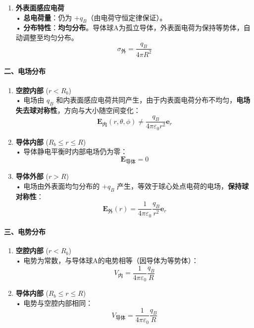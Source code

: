 \documentclass{article}
\begin{document}
{\begin{enumerate}
    \item \textbf{外表面感应电荷}  \\
    • \textbf{总电荷量}：仍为 \(+q_B\)（由电荷守恒定律保证）。  \\
    • \textbf{分布特性}：\textbf{均匀分布}。导体球A为孤立导体，外表面电荷为保持等势体，自动调整至均匀分布。  \\
    \[
    \sigma_{\text{外}} = \frac{q_B}{4\pi R^2}
    \]
\end{enumerate}


\paragraph*{二、电场分布}


\begin{enumerate}
    \item \textbf{空腔内部} (\(r < R_b\))  \\
    • 电场由 \(q_B\) 和内表面感应电荷共同产生，由于内表面电荷分布不均匀，\textbf{电场失去球对称性}，方向与大小随空间变化：  
    \[
    \mathbf{E}_\text{内}(r, \theta, \phi) \neq \frac{q_B}{4\pi\varepsilon_0 r^2} \mathbf{e}_r
    \]

    \item \textbf{导体内部} (\(R_b \leq r \leq R\))  \\
    • 导体静电平衡时内部电场仍为零：  
    \[
    \mathbf{E}_\text{导体} = 0
    \]

    \item \textbf{导体外部} (\(r > R\))  \\
    • 电场由外表面均匀分布的 \(+q_B\) 产生，等效于球心处点电荷的电场，\textbf{保持球对称性}：  
    \[
    \mathbf{E}_\text{外}(r) = \frac{1}{4\pi\varepsilon_0} \frac{q_B}{r^2} \mathbf{e}_r
    \]
\end{enumerate}



\paragraph*{三、电势分布}

\begin{enumerate}
    \item \textbf{空腔内部} (\(r < R_b\))  \\
    • 电势为常数，与导体球A的电势相等（因导体为等势体）：  
    \[
    V_\text{内} = \frac{1}{4\pi\varepsilon_0} \frac{q_B}{R}
    \]

    \item \textbf{导体内部} (\(R_b \leq r \leq R\))  \\
    • 电势与空腔内部相同：  
    \[
    V_\text{导体} = \frac{1}{4\pi\varepsilon_0} \frac{q_B}{R}
    \]


\end{enumerate}}
\end{document}

